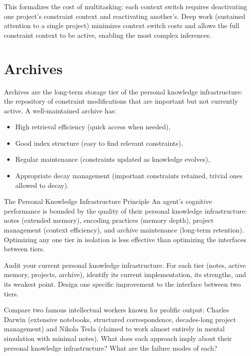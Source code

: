This formalizes the cost of multitasking: each context switch requires
deactivating one project's constraint context and reactivating another's.
Deep work (sustained attention to a single project) minimizes context
switch costs and allows the full constraint context to be active,
enabling the most complex inferences.

\section{Archives}

Archives are the long-term storage tier of the personal knowledge
infrastructure: the repository of constraint modifications that are
important but not currently active. A well-maintained archive has:
\begin{itemize}
  \item High retrieval efficiency (quick access when needed),
  \item Good index structure (easy to find relevant constraints),
  \item Regular maintenance (constraints updated as knowledge evolves),
  \item Appropriate decay management (important constraints retained,
        trivial ones allowed to decay).
\end{itemize}

\begin{namedthm}{The Personal Knowledge Infrastructure Principle}
  An agent's cognitive performance is bounded by the quality of their
  personal knowledge infrastructure: notes (extended memory), encoding
  practices (memory depth), project management (context efficiency),
  and archive maintenance (long-term retention). Optimizing any one
  tier in isolation is less effective than optimizing the interfaces
  between tiers.
\end{namedthm}

\begin{exercise}
  Audit your current personal knowledge infrastructure. For each tier
  (notes, active memory, projects, archive), identify its current
  implementation, its strengths, and its weakest point. Design one
  specific improvement to the interface between two tiers.
\end{exercise}

\begin{exercise}
  Compare two famous intellectual workers known for prolific output:
  Charles Darwin (extensive notebooks, structured correspondence,
  decades-long project management) and Nikola Tesla (claimed to
  work almost entirely in mental simulation with minimal notes).
  What does each approach imply about their personal knowledge
  infrastructure? What are the failure modes of each?
\end{exercise}
